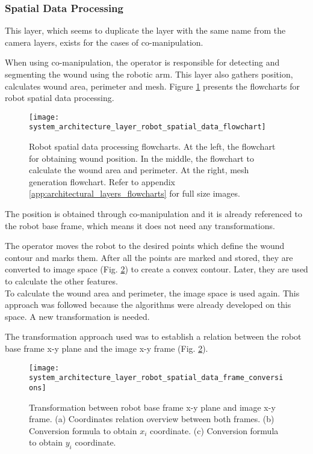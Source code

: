 \subsubsection*{Spatial Data Processing}
\label{subsubsec:system_architectural_robot_layers_spatial_data}

This layer, which seems to duplicate the layer with the same name from the camera layers, exists for the cases of co-manipulation. 

When using co-manipulation, the operator is responsible for detecting and segmenting the wound using the robotic arm. This layer also gathers position, calculates wound area, perimeter and mesh. Figure \ref{fig:system_architecture_layer_robot_spatial_data_flowchart} presents the flowcharts for robot spatial data processing.

\begin{figure}[htbp]
	\centering
	\texttt{[image: system\_architecture\_layer\_robot\_spatial\_data\_flowchart]}
	\caption{Robot spatial data processing flowcharts. At the left, the flowchart for obtaining wound position. In the middle, the flowchart to calculate the wound area and perimeter. At the right, mesh generation flowchart. Refer to appendix \ref{app:architectural_layers_flowcharts} for full size images.}
	\label{fig:system_architecture_layer_robot_spatial_data_flowchart}
\end{figure}

The position is obtained through co-manipulation and it is already referenced to the robot base frame, which means it does not need any transformations.

The operator moves the robot to the desired points which define the wound contour and marks them. After all the points are marked and stored, they are converted to image space (Fig. \ref{fig:system_architecture_layer_robot_spatial_data_frame_conversions}) to create a convex contour. Later, they are used to calculate the other features.\\

To calculate the wound area and perimeter, the image space is used again. This approach was followed because the algorithms were already developed on this space. A new transformation is needed.

The transformation approach used was to establish a relation between the robot base frame x-y plane and the image x-y frame (Fig. \ref{fig:system_architecture_layer_robot_spatial_data_frame_conversions}).

\begin{figure}[htbp]
	\centering
	\texttt{[image: system\_architecture\_layer\_robot\_spatial\_data\_frame\_conversions]}
	\caption{Transformation between robot base frame x-y plane and image x-y frame. (a) Coordinates relation overview between both frames. (b) Conversion formula to obtain $x_i$ coordinate. (c) Conversion formula to obtain $y_i$ coordinate.}
	\label{fig:system_architecture_layer_robot_spatial_data_frame_conversions}
\end{figure}

